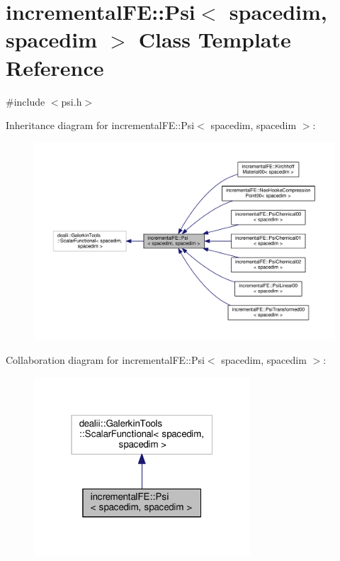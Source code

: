 \hypertarget{classincremental_f_e_1_1_psi_3_01spacedim_00_01spacedim_01_4}{}\section{incremental\+FE\+:\+:Psi$<$ spacedim, spacedim $>$ Class Template Reference}
\label{classincremental_f_e_1_1_psi_3_01spacedim_00_01spacedim_01_4}


{\ttfamily \#include $<$psi.\+h$>$}



Inheritance diagram for incremental\+FE\+:\+:Psi$<$ spacedim, spacedim $>$\+:\nopagebreak
\begin{figure}[H]
\begin{center}
\leavevmode
\includegraphics[width=350pt]{classincremental_f_e_1_1_psi_3_01spacedim_00_01spacedim_01_4__inherit__graph}
\end{center}
\end{figure}


Collaboration diagram for incremental\+FE\+:\+:Psi$<$ spacedim, spacedim $>$\+:\nopagebreak
\begin{figure}[H]
\begin{center}
\leavevmode
\includegraphics[width=229pt]{classincremental_f_e_1_1_psi_3_01spacedim_00_01spacedim_01_4__coll__graph}
\end{center}
\end{figure}

